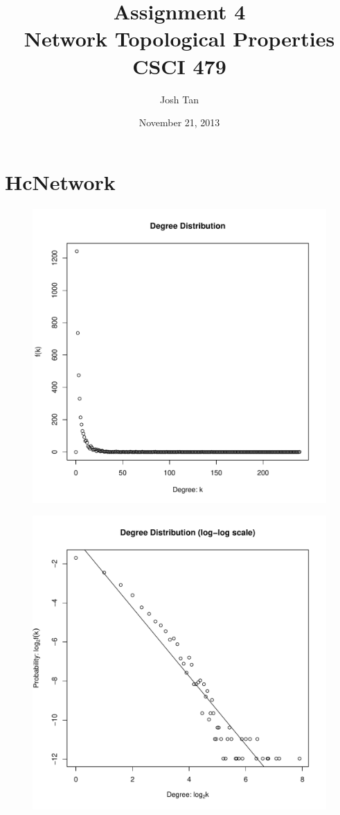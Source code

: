 \documentclass{report}
\title{Assignment 4\\Network Topological Properties\\[1em]CSCI 479}
\author{Josh Tan}
\date{November 21, 2013}
\begin{document}
\maketitle

\section*{HcNetwork}

\begin{figure}[htp!]
  \centering
  \includegraphics[width=0.65\linewidth]{HcNetwork}
\end{figure}
\vspace{-2em}
\begin{figure}[htp!]
  \centering
  \includegraphics[width=0.65\linewidth]{HcNetworkLog}
\end{figure}
\end{document}
